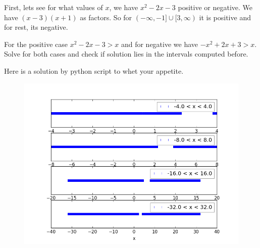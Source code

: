 \documentclass[answers,addpoints]{exam}
\begin{document}
\begin{questions}

\begin{solution}

    First, lets see for what values of $x$, we have $x^2 - 2x - 3$ positive or
    negative. We have $(x-3)(x+1)$ as factors. So for $(-\infty, -1] \cup [3,
    \infty)$ it is positive and for rest, its negative.

    For the positive case $ x^2 - 2x - 3 > x$ and for negative we have $ - x^2 + 2x
    + 3 > x$. Solve for both cases and check if solution lies in the intervals
    computed before.

    Here is a solution by python script to whet your appetite.

    \begin{figure}[H]
        \begin{center}
            \includegraphics[width=1\columnwidth]{sol2_b.py.png}
        \end{center}
        \caption{}
        \label{fig:}
    \end{figure}

\end{solution}



\end{questions}
\end{document}
